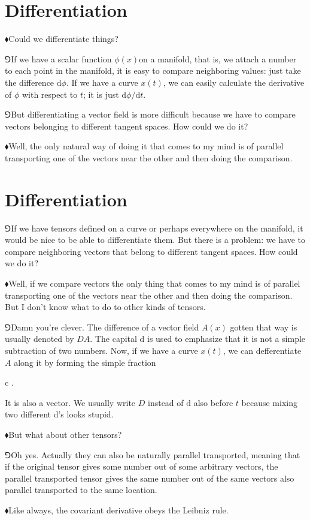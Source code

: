 \documentclass[10pt,oneside%
]{memoir}
\newenvironment{eqna}{\begin{IEEEeqnarray*}{c}}{\end{IEEEeqnarray*}\ignorespacesafterend}
\newcommand{\cder}[2]{\frac{D #1}{D #2}}
\newcommand{\dd}{\mathrm{d}}
\newcommand{\hea}{\(\blacklozenge\)\;}
\newcommand{\heb}{\(\Game\)\;}
\begin{document}
\section{Differentiation}
\hea Could we differentiate things?

\heb If we have a scalar function \(\phi(x)\)on a manifold, that is, we attach a number to each point in the manifold, it is easy to compare neighboring values: just take the difference \(\dd\phi\). If we have a curve \(x(t)\), we can easily calculate the derivative of \(\phi\) with respect to \(t\); it is just \(\dd\phi/\dd t\).

\heb But differentiating a vector field is more difficult because we have to compare vectors belonging to different tangent spaces. How could we do it?

\hea Well, the only natural way of doing it that comes to my mind is of parallel transporting one of the vectors near the other and then doing the comparison.
\section{Differentiation}
\heb If we have tensors defined on a curve or perhaps everywhere on the manifold, it would be nice to be able to differentiate them. But there is a problem: we have to compare neighboring vectors that belong to different tangent spaces. How could we do it?

\hea Well, if we compare vectors the only thing that comes to my mind is of parallel transporting one of the vectors near the other and then doing the comparison. But I don't know what to do to other kinds of tensors.

\heb Damn you're clever. The difference of a vector field \(A(x)\) gotten that way is usually denoted by \(DA\). The capital d is used to emphasize that it is not a simple subtraction of two numbers. Now, if we have a curve \(x(t)\), we can defferentiate \(A\) along it by forming the simple fraction
\begin{eqna}
    \frac{DA}{\dd t}\doteq\cder{A}{t}.
\end{eqna}
It is also a vector. We usually write \(D\) instead of \(\dd\) also before \(t\) because mixing two different d's looks stupid.

\hea But what about other tensors?

\heb Oh yes. Actually they can also be naturally parallel transported, meaning that if the original tensor gives some number out of some arbitrary vectors, the parallel transported tensor gives the same number out of the same vectors also parallel transported to the same location.

\hea Like always, the covariant derivative obeys the Leibniz rule.

\
\end{document}
